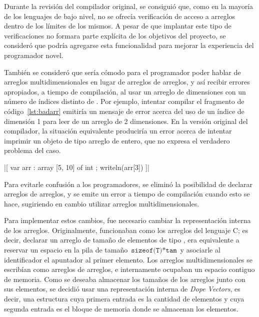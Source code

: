 Durante la revisión del compilador original, se consiguió que, como en la
mayoría de los lenguajes de bajo nivel, no se ofrecía verificación de acceso a
arreglos dentro de los límites de los mismos. A pesar de que implantar este tipo
de verificaciones no formara parte explícita de los objetivos del proyecto, se
consideró que podría agregarse esta funcionalidad para mejorar la experiencia
del programador novel.

También se consideró que sería cómodo para el programador poder hablar de
arreglos multidimensionales en lugar de arreglos de arreglos, y así recibir
errores apropiados, a tiempo de compilación, al usar un arreglo de 
dimensiones con un número de índices distinto de . Por ejemplo,
intentar compilar el fragmento de código~\ref{lst:badarr} emitiría un mensaje de
error acerca del uso de un índice de dimensión 1 para leer de un arreglo de 2
dimensiones. En la versión original del compilador, la situación equivalente
produciría un error acerca de intentar imprimir un objeto de tipo arreglo de
entero, que no expresa el verdadero problema del caso.

\begin{gracielacode}[caption=Error en dimensiones de arreglo, label=lst:badarr]
|[ var arr : array [5, 10] of int
 ;  writeln(arr[3])
]|
\end{gracielacode}

Para evitarle confusión a los programadores, se eliminó la posibilidad de
declarar arreglos de arreglos, y se emite un error a tiempo de compilación
cuando esto se hace, sugiriendo en cambio utilizar arreglos multidimensionales.

Para implementar estos cambios, fue necesario cambiar la representación interna
de los arreglos. Originalmente, funcionaban como los arreglos del lenguaje C; es
decir, declarar un arreglo  de tamaño  de elementos de
tipo , era equivalente a reservar un espacio en la pila de tamaño
$\texttt{sizeof(T)} * \texttt{tam}$ y asociarle al identificador  el
apuntador al primer elemento. Los arreglos multidimensionales se escribían como
arreglos de arreglos, e internamente ocupaban un espacio contiguo de memoria.
Como se deseaba almacenar los tamaños de los arreglos junto con sus elementos,
se decidió usar una representación interna de \textit{Dope Vectors}, es decir, una estructura cuya primera entrada es la cantidad de
elementos y cuya segunda entrada es el bloque de memoria donde se almacenan los
elementos.

